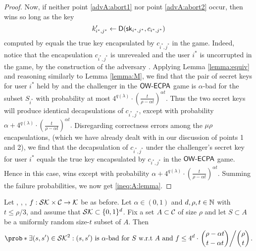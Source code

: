 \begin{proof}
  Now, if neither point \ref{advA:abort1} nor point \ref{advA:abort2} occur,
  then \advA wins so long as the key
  \[
  k_{i^{*},j^{*}}' \leftarrow \mathsf{D}(\mathsf{sk}_{i^{*},j^{*}}, c_{i^{*},j^{*}})
  \]
  computed by \advA equals the true key encapsulated by \(c_{i^{*},j^{*}}\) in the game.
  Indeed, notice that the encapsulation \(c_{i^{*},j^{*}}\) is unrevealed
  and the user \(i^{*}\) is uncorrupted in the \OWECPA game,
  by the construction of the adversary \advA.
  Applying Lemma \ref{lemma:equiv}
  and reasoning similarly to Lemma \ref{lemma:M},
  we find that the pair of secret keys for user \(i^{*}\) held by \advA
  and the challenger in the \(\mathsf{OW}\text{-}\mathsf{ECPA}\) game is
  \(\alpha\)-bad for the subset \(S_{i^{*}}\) with probability at most
  \(
    4^{q(\lambda)} \cdot \left( \frac{t}{\rho - \alpha t} \right)^{\alpha t}.
  \)
  Thus the two secret keys will produce identical decapsulations of \(c_{i^{*},j^{*}}\), except with probability
  \(
    \alpha +
    4^{q(\lambda)} \cdot \left( \frac{t}{\rho - \alpha t} \right)^{\alpha t}.
  \)
  Disregarding correctness errors among the \(\mu \rho\) encapsulations,
  (which we have already dealt with in our discussion of points 1 and 2),
  we find that the decapsulation of \(c_{i^{*},j^{*}}\)
  under the challenger's secret key for user \(i^{*}\)
  equals the true key encapsulated by \(c_{i^{*},j^{*}}\) in the \(\mathsf{OW}\text{-}\mathsf{ECPA}\) game.
  Hence in this case, \advA wins except with probability
  \(
  \alpha
  + 4^{q(\lambda)} \cdot \left( \frac{t}{\rho - \alpha t} \right)^{\alpha t}.
  \)
  Summing the failure probabilities, we now get \eqref{ineq:A:lemma}.
\end{proof}


\begin{lemma}\label{lemma:equiv}
  Let \setSK, \setC, \keyspace, \(f : \mathcal{SK} \times \mathcal{C} \to \mathcal{K}\) be as before.
  Let \(\alpha \in (0,1)\) and \(d,\rho,t \in \mathbb{N}\) with \(t \le \rho/3\),
  and assume that \(\mathcal{SK} \subset \{0,1\}^{d}\).
  Fix a set \(A \subset \mathcal{C}\) of size \(\rho\)
  and let \(S \subset A\) be a uniformly random size-\(t\) subset of \(A\).
  Then
  \begin{align}\label{ineq:equiv}
    \prob*{\exists (s,s') \in \setSK^{2} : (s,s') \text{ is \(\alpha\)-bad for } S \text{ w.r.t \(A\) and \(f\)}}
    \le 4^{d} \cdot \left. \binom{\rho - \alpha t}{t - \alpha t} \middle/ \binom{\rho}{t} \right..
  \end{align}
\end{lemma}

